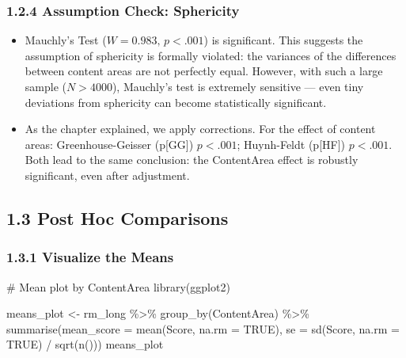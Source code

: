 \documentclass[
  letterpaper,
  DIV=11,
  numbers=noendperiod]{scrreprt}
\newenvironment{Shaded}{\begin{snugshade}}{\end{snugshade}}
\newcommand{\AttributeTok}[1]{\textcolor[rgb]{0.40,0.45,0.13}{#1}}
\newcommand{\CommentTok}[1]{\textcolor[rgb]{0.37,0.37,0.37}{#1}}
\newcommand{\ConstantTok}[1]{\textcolor[rgb]{0.56,0.35,0.01}{#1}}
\newcommand{\FunctionTok}[1]{\textcolor[rgb]{0.28,0.35,0.67}{#1}}
\newcommand{\NormalTok}[1]{\textcolor[rgb]{0.00,0.23,0.31}{#1}}
\newcommand{\OtherTok}[1]{\textcolor[rgb]{0.00,0.23,0.31}{#1}}
\newcommand{\SpecialCharTok}[1]{\textcolor[rgb]{0.37,0.37,0.37}{#1}}
\begin{document}
\subsubsection*{1.2.4 Assumption Check:
Sphericity}\label{assumption-check-sphericity}

\begin{itemize}
\item
  Mauchly's Test (\(W  = 0.983, \, p < .001\)) is significant. This
  suggests the assumption of sphericity is formally violated: the
  variances of the differences between content areas are not perfectly
  equal. However, with such a large sample (\(N > 4000\)), Mauchly's
  test is extremely sensitive --- even tiny deviations from sphericity
  can become statistically significant.
\item
  As the chapter explained, we apply corrections. For the effect of
  content areas: Greenhouse-Geisser (p{[}GG{]}) \(p < .001\);
  Huynh-Feldt (p{[}HF{]}) \(p < .001\). Both lead to the same
  conclusion: the ContentArea effect is robustly significant, even after
  adjustment.
\end{itemize}

\subsection*{1.3 Post Hoc Comparisons}\label{post-hoc-comparisons-1}

\subsubsection*{1.3.1 Visualize the Means}\label{visualize-the-means}

\begin{Shaded}
\begin{Highlighting}[]
\CommentTok{\# Mean plot by ContentArea }
\FunctionTok{library}\NormalTok{(ggplot2) }
 
\NormalTok{means\_plot }\OtherTok{\textless{}{-}}\NormalTok{ rm\_long }\SpecialCharTok{\%\textgreater{}\%} 
  \FunctionTok{group\_by}\NormalTok{(ContentArea) }\SpecialCharTok{\%\textgreater{}\%} 
  \FunctionTok{summarise}\NormalTok{(}\AttributeTok{mean\_score =} \FunctionTok{mean}\NormalTok{(Score, }\AttributeTok{na.rm =} \ConstantTok{TRUE}\NormalTok{), }
            \AttributeTok{se =} \FunctionTok{sd}\NormalTok{(Score, }\AttributeTok{na.rm =} \ConstantTok{TRUE}\NormalTok{) }\SpecialCharTok{/} \FunctionTok{sqrt}\NormalTok{(}\FunctionTok{n}\NormalTok{())) }
\NormalTok{means\_plot }
\end{Highlighting}
\end{Shaded}
\end{document}
